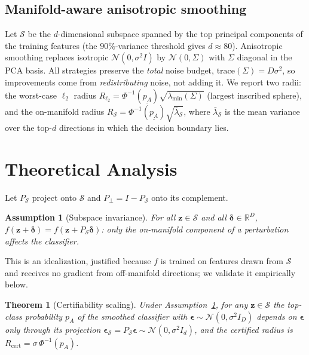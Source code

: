 \documentclass{article}
\def\z{{\mathbf z}}
\def\eps{{\boldsymbol \epsilon}}
\def\del{{\boldsymbol \delta}}
\newcommand{\Rcert}{R_{\mathrm{cert}}}
\newcommand{\punder}{\underline{p_A}}
\newcommand{\Smanifold}{\mathcal{S}}
\newtheorem{theorem}{Theorem}
\newtheorem{assumption}{Assumption}
\begin{document}
\subsection{Manifold-aware anisotropic smoothing}
\label{ssec:aniso}

Let $\Smanifold$ be the $d$-dimensional subspace spanned by the top principal components of the training features (the $90\%$-variance threshold gives $d\!\approx\!80$). Anisotropic smoothing replaces isotropic $\mathcal{N}(0,\sigma^2 I)$ by $\mathcal{N}(0,\Sigma)$ with $\Sigma$ diagonal in the PCA basis. All strategies preserve the \emph{total} noise budget, $\mathrm{trace}(\Sigma)=D\sigma^2$, so improvements come from \emph{redistributing} noise, not adding it. We report two radii: the worst-case $\ell_2$ radius $R_{\ell_2}=\Phi^{-1}(\punder)\sqrt{\lambda_{\min}(\Sigma)}$ (largest inscribed sphere), and the on-manifold radius $R_{\Smanifold}=\Phi^{-1}(\punder)\sqrt{\bar\lambda_{\Smanifold}}$, where $\bar\lambda_{\Smanifold}$ is the mean variance over the top-$d$ directions in which the decision boundary lies.

\section{Theoretical Analysis}
\label{sec:theory}

Let $P_\Smanifold$ project onto $\Smanifold$ and $P_\perp=I-P_\Smanifold$ onto its complement.

\begin{assumption}[Subspace invariance]
\label{assm:subspace}
For all $\z\in\Smanifold$ and all $\del\in\mathbb{R}^D$, $f(\z+\del)=f(\z+P_\Smanifold\del)$: only the on-manifold component of a perturbation affects the classifier.
\end{assumption}

This is an idealization, justified because $f$ is trained on features drawn from $\Smanifold$ and receives no gradient from off-manifold directions; we validate it empirically below.

\begin{theorem}[Certifiability scaling]
\label{thm:scaling}
Under Assumption~\ref{assm:subspace}, for any $\z\in\Smanifold$ the top-class probability $p_A$ of the smoothed classifier with $\eps\sim\mathcal{N}(0,\sigma^2 I_D)$ depends on $\eps$ only through its projection $\eps_\Smanifold=P_\Smanifold\eps\sim\mathcal{N}(0,\sigma^2 I_d)$, and the certified radius is $\Rcert=\sigma\,\Phi^{-1}(p_A)$.
\end{theorem}
\end{document}
